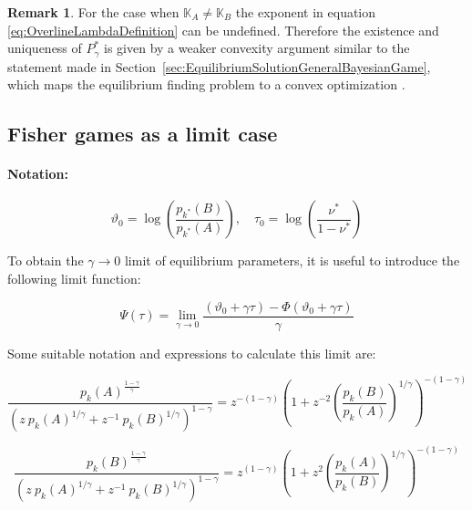 \documentclass{article}
\theoremstyle{definition}
\newtheorem*{remark}{Remark}
\begin{document}
\begin{remark}
    For the case when $\mathbb{K}_A \ne \mathbb{K}_B$ the exponent in equation \eqref{eq:OverlineLambdaDefinition} can be undefined. 
    Therefore the existence and uniqueness of $P^*_\gamma$ is given by a weaker convexity argument similar to the statement made in Section~\ref{sec:EquilibriumSolutionGeneralBayesianGame}, which maps the equilibrium finding problem to a convex optimization \cite{book:ConvexOpt}.
    
\end{remark}

\subsection{Fisher games as a limit case}

\paragraph{Notation:}

\begin{equation}
    \vartheta_0 = \log \left ( \frac{p_{k^*}(B)}{p_{k^*}(A)} \right ), \quad 
    \tau_0 = \log \left ( \frac{\nu^*}{1-\nu^*} \right )
\end{equation}

To obtain the $\gamma \to 0$ limit of equilibrium parameters, it is useful to introduce the following limit function:

\begin{equation}
    \Psi(\tau) = \lim_{\gamma \to 0} \frac{(\vartheta_0 + \gamma \tau) - \Phi(\vartheta_0 + \gamma \tau)}{\gamma}
\end{equation}

Some suitable notation and expressions to calculate this limit are:

\begin{equation}
    \frac{p_k(A)^{\frac{1-\gamma}{\gamma}}}{\left ( z \ p_k(A)^{1/\gamma} + z^{-1} \ p_k(B)^{1/\gamma} \right )^{1-\gamma}} = 
    z^{-(1-\gamma)} \left ( 1 + z^{-2} \left ( \frac{p_k(B)}{p_k(A)} \right )^{1/\gamma} \right )^{-(1-\gamma)}
\end{equation}

\begin{equation}
    \frac{p_k(B)^{\frac{1-\gamma}{\gamma}}}{\left ( z \ p_k(A)^{1/\gamma} + z^{-1} \ p_k(B)^{1/\gamma} \right )^{1-\gamma}} = 
    z^{(1-\gamma)} \left ( 1 + z^{2} \left ( \frac{p_k(A)}{p_k(B)} \right )^{1/\gamma} \right )^{-(1-\gamma)}
\end{equation}
\end{document}
